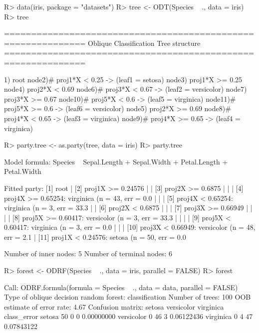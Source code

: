 \documentclass[nojss]{jss}
\numberwithin{equation}{section}
\begin{document}
\begin{Schunk}
\begin{Sinput}
R> data(iris, package = "datasets")
R> tree <- ODT(Species ~ ., data = iris)
R> tree
\end{Sinput}
\begin{Soutput}
============================================================= 
Oblique Classification Tree structure 
=============================================================

1) root
   node2)# proj1*X < 0.25 -> (leaf1 = setosa)
   node3)  proj1*X >= 0.25
      node4)  proj2*X < 0.69
         node6)# proj3*X < 0.67 -> (leaf2 = versicolor)
         node7)  proj3*X >= 0.67
            node10)# proj5*X < 0.6 -> (leaf5 = virginica)
            node11)# proj5*X >= 0.6 -> (leaf6 = versicolor)
      node5)  proj2*X >= 0.69
         node8)# proj4*X < 0.65 -> (leaf3 = virginica)
         node9)# proj4*X >= 0.65 -> (leaf4 = virginica)
\end{Soutput}
\begin{Sinput}
R> party.tree <- as.party(tree, data = iris)
R> party.tree
\end{Sinput}
\begin{Soutput}
Model formula:
Species ~ Sepal.Length + Sepal.Width + Petal.Length + Petal.Width

Fitted party:
[1] root
|   [2] proj1X >= 0.24576
|   |   [3] proj2X >= 0.6875
|   |   |   [4] proj4X >= 0.65254: virginica (n = 43, err = 0.0%
|   |   |   [5] proj4X < 0.65254: virginica (n = 3, err = 33.3%
|   |   [6] proj2X < 0.6875
|   |   |   [7] proj3X >= 0.66949
|   |   |   |   [8] proj5X >= 0.60417: versicolor (n = 3, err = 33.3%
|   |   |   |   [9] proj5X < 0.60417: virginica (n = 3, err = 0.0%
|   |   |   [10] proj3X < 0.66949: versicolor (n = 48, err = 2.1%
|   [11] proj1X < 0.24576: setosa (n = 50, err = 0.0%

Number of inner nodes:    5
Number of terminal nodes: 6
\end{Soutput}
\begin{Sinput}
R> forest <- ODRF(Species ~ ., data = iris, parallel = FALSE)
R> forest
\end{Sinput}
\begin{Soutput}
Call:
 ODRF.formula(formula = Species ~ ., data = data, parallel = FALSE) 
               Type of oblique decision random forest: classification
                                      Number of trees: 100
                           OOB estimate of error rate: 4.67%
Confusion matrix:
           setosa versicolor virginica class_error
setosa         50          0         0  0.00000000
versicolor      0         46         3  0.06122436
virginica       0          4        47  0.07843122
\end{Soutput}
\end{Schunk}
\end{document}
